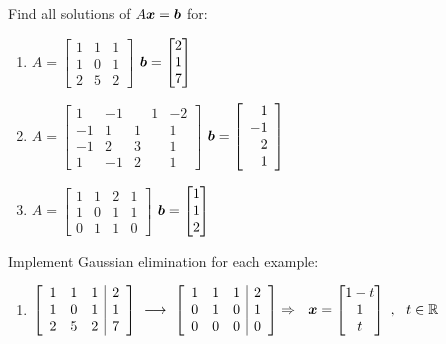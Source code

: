 \begin{example}
Find all solutions of $A \boldsymbol{x} = \boldsymbol{b}$ for:
\begin{enumerate}
\item $A = \begin{bmatrix} 1 & 1 & 1 \\ 1 & 0 & 1 \\ 2 & 5 & 2 \end{bmatrix}$ \hspace{3mm} $\boldsymbol{b} = \begin{bmatrix} 2 \\ 1 \\ 7 \end{bmatrix}$
\item $A = \left[ \begin{array}{rrrr} 1 & -1 & \phantom{+}1 & -2 \\ -1 & 1 & 1 & 1 \\ -1 & 2 & 3 & 1 \\ 1 & -1 & 2 & 1 \end{array} \right]$ \hspace{3mm} $\boldsymbol{b} = \left[ \begin{array}{r} 1 \\ -1 \\ 2 \\ 1 \end{array} \right]$
\item $A = \begin{bmatrix} 1 & 1 & 2 & 1 \\ 1 & 0 & 1 & 1 \\ 0 & 1 & 1 & 0 \end{bmatrix}$ \hspace{3mm} $\boldsymbol{b} = \begin{bmatrix} 1 \\ 1 \\ 2 \end{bmatrix}$
\end{enumerate}
Implement Gaussian elimination for each example:
\begin{enumerate}
\item $\left[ \begin{array}{rrr|r} 1 & 1 & 1 & 2 \\ 1 & 0 & 1 & 1 \\ 2 & 5 & 2 & 7 \end{array} \right] \ \longrightarrow \ \left[ \begin{array}{rrr|r} 1 & 1 & 1 & 2 \\ 0 & 1 & 0 & 1 \\ 0 & 0 & 0 & 0 \end{array} \right] \Rightarrow \ \ \boldsymbol{x} = \begin{bmatrix} 1-t \\ 1 \\ t \end{bmatrix} \ , \ \ t \in \mathbb{R}$

\end{enumerate}
\end{example}
